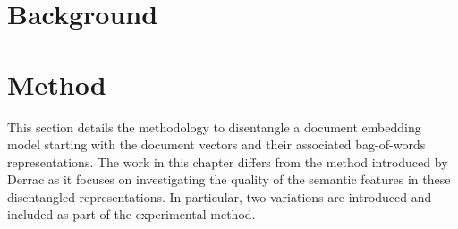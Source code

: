 
\section{Background}\label{ch3:background}


\section{Method}\label{ch3:method}

This section details the methodology to disentangle a document embedding model starting with the document vectors and their associated bag-of-words  representations.  The work in this chapter differs from the method introduced by Derrac \cite{Derrac2015} as it focuses on investigating the quality of the semantic features in these disentangled representations. In particular, two variations are introduced and included as part of the experimental method.%




